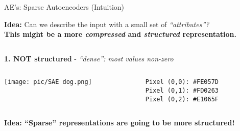 \documentclass[serif, aspectratio=169]{beamer}
\begin{document}
\begin{frame}{AE’s: Sparse Autoencoders (Intuition)}
    \scriptsize
    
    \textbf{Idea:} Can we describe the input with a small set of \textit{“attributes”?}
    \\\textbf{This might be a more \textit{compressed} and \textit{structured} representation.}
    
    \begin{columns}[t]
    
        \begin{column}{0.7\textwidth}
        
             \textbf{\textcolor{deepgreen}{1. NOT structured}} - \textit{“dense”: most values non-zero}
            \begin{tcolorbox}[colback=white!10, colframe=white, boxrule=0.5pt, width=\textwidth]
                \begin{columns}[T]
                    \begin{column}{0.2\textwidth}
                        \texttt{[image: pic/SAE dog.png]} 
                    \end{column}
                    \begin{column}{0.75\textwidth}
                        \scriptsize{\texttt{Pixel (0,0): \#FE057D \\
                        Pixel (0,1): \#FD0263 \\
                        Pixel (0,2): \#E1065F}} \\
                    \end{column}
                \end{columns}
            \end{tcolorbox}

            
        \vspace{0.3cm}

            \textbf{\textcolor{deepred}{Idea: “Sparse” representations are going to be more structured!}}
            
        \vspace{0.6cm}


\end{column}
\end{columns}
\end{frame}
\end{document}
